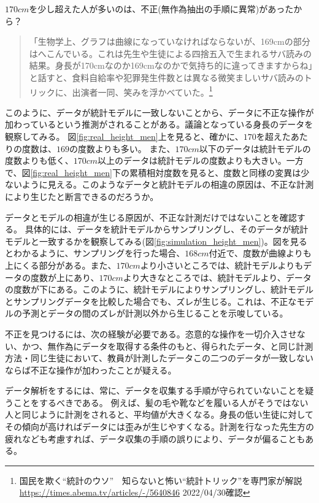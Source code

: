 \begin{SMbox}{$170cm$を少し超えた人が多いのは、不正(無作為抽出の手順に異常)があったから？}
\begin{quotation}
    「生物学上、グラフは曲線になっていなければならないが、169cmの部分はへこんでいる。これは先生や生徒による四捨五入で生まれるサバ読みの結果。身長が170cmなのか169cmなのかで気持ち的に違ってきますからね」と話すと、食料自給率や犯罪発生件数とは異なる微笑ましいサバ読みのトリックに、出演者一同、笑みを浮かべていた。\footnote{国民を欺く“統計のウソ”　知らないと怖い“統計トリック”を専門家が解説
    \url{https://times.abema.tv/articles/-/5640846} 2022/04/30確認}
\end{quotation}

このように、データが統計モデルに一致しないことから、データに不正な操作が加わっているという推測がされることがある。議論となっている身長のデータを観察してみる。
図\ref{fig:real_height_men}上を見ると、確かに、$170$を超えたあたりの度数は、$169$の度数よりも多い。
また、$170cm$以下のデータは統計モデルの度数よりも低く、$170cm$以上のデータは統計モデルの度数よりも大きい。一方で、図\ref{fig:real_height_men}下の累積相対度数を見ると、度数と同様の変異は少ないように見える。このようなデータと統計モデルの相違の原因は、不正な計測により生じたと断言できるのだろうか。

データとモデルの相違が生じる原因が、不正な計測だけではないことを確認する。
具体的には、データを統計モデルからサンプリングし、そのデータが統計モデルと一致するかを観察してみる(図\ref{fig:simulation_height_men})。図を見るとわかるように、サンプリングを行った場合、$168cm$付近で、度数が曲線よりも上にくる部分がある。また、$170cm$より小さいところでは、統計モデルよりもデータの度数が上にあり、$170cm$より大きなところでは、統計モデルより、データの度数が下にある。このように、統計モデルによりサンプリングし、統計モデルとサンプリングデータを比較した場合でも、ズレが生じる。これは、不正なモデルの予測とデータの間のズレが計測以外から生じることを示唆している。


不正を見つけるには、次の経験が必要である。恣意的な操作を一切介入させない、かつ、無作為にデータを取得する条件のもと、得られたデータ、と同じ計測方法・同じ生徒において、教員が計測したデータこの二つのデータが一致しないならば不正な操作が加わったことが疑える。

データ解析をするには、常に、データを収集する手順が守られていないことを疑うことをするべきである。
例えば、髪の毛や靴などを履いる人がそうではない人と同じように計測をされると、平均値が大きくなる。身長の低い生徒に対してその傾向が高ければデータには歪みが生じやすくなる。計測を行なった先生方の疲れなども考慮すれば、データ収集の手順の誤りにより、データが偏ることもある。


\end{SMbox}
